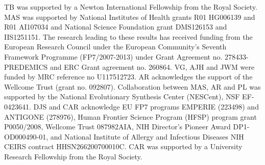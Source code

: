 \documentclass[11pt,oneside,letterpaper]{article}
\begin{document}
TB was supported by a Newton International Fellowship from the Royal Society. 
MAS was supported by National Institutes of Health grants R01 HG006139 and R01 AI107034 and National Science Foundation grant DMS126153 and IIS1251151.
The research leading to these results has received funding from the European Research Council under the European Community's Seventh Framework Programme (FP7/2007-2013) under Grant Agreement no. 278433-PREDEMICS and ERC Grant agreement no. 260864.
VG, AJH and JWM were funded by MRC reference no U117512723.
AR acknowledges the support of the Wellcome Trust (grant no. 092807).
Collaboration between MAS, AR and PL was supported by the National Evolutionary Synthesis Center (NESCent), NSF EF-0423641.
DJS and CAR acknowledge EU FP7 programs EMPERIE (223498) and ANTIGONE (278976), Human Frontier Science Program (HFSP) program grant P0050/2008, Wellcome Trust 087982AIA, NIH Director's Pioneer Award DP1-OD000490-01, and National Institute of Allergy and Infectious Diseases NIH CEIRS contract HHSN266200700010C.
CAR was supported by a University Research Fellowship from the Royal Society.



\end{document}
